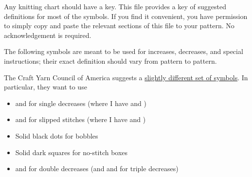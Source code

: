 \documentclass{amsart}
\newif \ifdesigner
\begin{document}
\begin{fullpages}

\ifdesigner
Any knitting chart should have a key. This file provides a key of
suggested definitions for most of the symbols. If you find it
convenient, you have permission to simply copy and paste the relevant
sections of this file to your pattern. No acknowledgement is required.

The following symbols are meant to be used for increases, decreases,
and special instructions; their
exact definition should vary from pattern to pattern.

\begin{quote}
\quad
\textknit{!}
\quad
\textknit{*}
\end{quote}


The Craft Yarn Council of America suggests a \href{http://www.craftyarncouncil.com/chart_knit.html}{slightly different set of symbols}. In particular, they want to use

\begin{itemize}

\item \textknit{)} and \textknit{(} for single decreases (where I have \textknit{>} and \textknit{<})

\item {} and  for slipped stitches (where I have  and )

\item Solid black dots  for bobbles

\item Solid dark squares  for no-stitch boxes

\item 
{}
and 
for double decreases (and 
and 
for triple decreases)


\end{itemize}
\end{fullpages}
\end{document}
